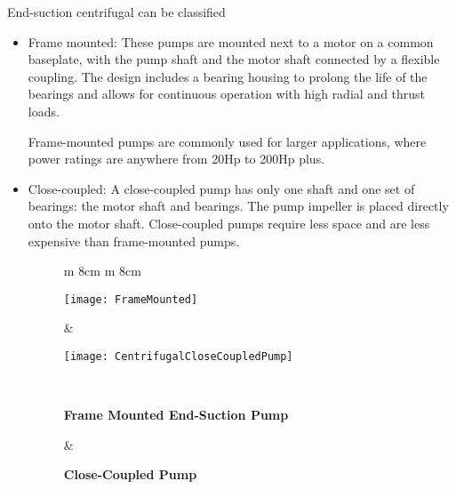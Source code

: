 \begin{enumerate}
\begin{itemize}
End-suction centrifugal can be classified 

\begin{itemize}
\item Frame mounted:  These pumps are mounted next to a motor on a common baseplate, with the pump shaft and the motor shaft connected by a flexible coupling. The design includes a bearing housing to prolong the life of the bearings and allows for continuous operation with high radial and thrust loads.

\vspace{0.2cm}

Frame-mounted pumps are commonly used for larger applications, where power ratings are anywhere from 20Hp to 200Hp plus.

\item Close-coupled:  A close-coupled pump has only one shaft and one set of bearings: the motor shaft and bearings. The pump impeller is placed directly onto the motor shaft. Close-coupled pumps require less space and are less expensive than frame-mounted pumps.


\begin{figure}[h!]
\begin{tabular}{  m {8cm}  m {8cm} } 
\begin{center}\texttt{[image: FrameMounted]} \end{center} & \begin{center} \texttt{[image: CentrifugalCloseCoupledPump]} \end{center}\\
\begin{center} \textbf{Frame Mounted End-Suction Pump} \end{center} & \begin{center}\textbf{Close-Coupled Pump} \end{center}\\
\end{tabular}\\
\end{figure}




\end{itemize}
\end{itemize}
\end{enumerate}
